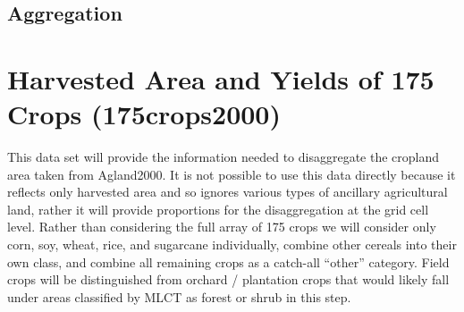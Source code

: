 
\subsection{Aggregation}
\label{sec:cdl-aggr}


\section{Harvested Area and Yields of 175 Crops (175crops2000)}
\label{sec:175crops2000}

\citet{Monfreda2008}




This data set will provide the information needed to disaggregate the
cropland area taken from Agland2000.  It is not possible to use this
data directly because it reflects only harvested area and so ignores
various types of ancillary agricultural land, rather it will provide
proportions for the disaggregation at the grid cell level.  Rather
than considering the full array of 175 crops we will consider only
corn, soy, wheat, rice, and sugarcane individually, combine other
cereals into their own class, and combine all remaining crops as a
catch-all ``other'' category.  Field crops will be distinguished from
orchard / plantation crops that would likely fall under areas
classified by MLCT as forest or shrub in this step.


